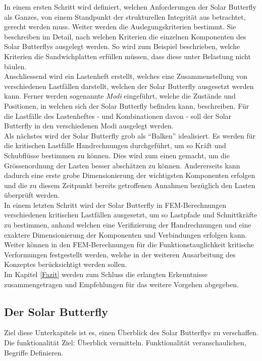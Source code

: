 In einem ersten Schritt wird definiert, welchen Anforderungen der Solar Butterfly als Ganzes, von einem Standpunkt der strukturellen Integrität aus betrachtet, gerecht werden muss. Weiter werden die Auslegungskriterien bestimmt. Sie beschreiben im Detail, nach welchen Kriterien die einzelnen Komponenten des Solar Butterflys ausgelegt werden. So wird zum Beispiel beschrieben, welche Kriterien die Sandwichplatten erfüllen müssen, dass diese unter Belastung nicht bäulen.\\
Anschliessend wird ein Lastenheft erstellt, welches eine Zusammenstellung von verschiedenen Lastfällen darstellt, welchen der Solar Butterfly ausgesetzt werden kann. Ferner werden sogenannte \emph{Modi} eingeführt, welche die Zustände und Positionen, in welchen sich der Solar Butterfly befinden kann, beschreiben. Für die Lastfälle des Lastenheftes - und Kombinationen davon - soll der Solar Butterfly in den verschiedenen Modi ausgelegt werden.\\
Als nächstes wird der Solar Butterfly grob als ``Balken'' idealisiert. Es werden für die kritischen Lastfälle Handrechnungen durchgeführt, um so Kräft und Schubflüsse bestimmen zu können. Dies wird zum einen gemacht, um die Grössenordnung der Lasten besser abschätzen zu können. Andererseits kann dadurch eine erste grobe Dimensionierung der wichtigsten Komponenten erfolgen und die zu diesem Zeitpunkt bereits getroffenen Annahmen bezüglich den Lasten überprüft werden.\\
In einem letzten Schritt wird der Solar Butterfly in FEM-Berechnungen verschiedenen kritischen Lastfällen ausgesetzt, um so Lastpfade und Schnittkräfte zu bestimmen, anhand welchen eine Verifizierung der Handrechnungen und eine exaktere Dimensionierung der Komponenten und Verbindungen erfolgen kann. Weiter können in den FEM-Berechnungen für die Funktionstauglichkeit kritische Verformungen festgestellt werden, welche in der weiteren Ausarbeitung des Konzeptes berücksichtigt werden sollen.\\
Im Kapitel \ref{Fazit} werden zum Schluss die erlangten Erkenntnisse zusammengetragen und Empfehlungen für das weitere Vorgehen abgegeben.

\subsection{Der Solar Butterfly}
Ziel diese Unterkapitels ist es, einen Überblick des Solar Butterflys zu verschaffen. Die funktionalität
Ziel: Überblick vermitteln. Funktionalität veranschaulichen, Begriffe Definieren.

